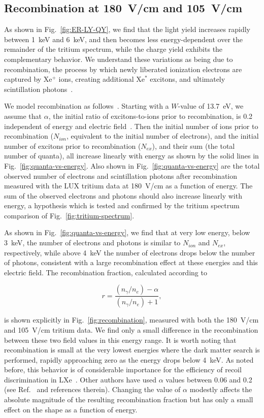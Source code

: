 \subsection{Recombination at 180~V/cm and 105~V/cm}

As shown in Fig.~\ref{fig:ER-LY-QY}, we find that the light yield increases rapidly between 1~keV and 6~keV, and then becomes less energy-dependent over the remainder of the tritium spectrum, while the charge yield exhibits the complementary behavior. We understand these variations as being due to recombination, the process by which newly liberated ionization electrons are captured by Xe$^+$ ions, creating additional Xe$^*$ excitons, and ultimately scintillation photons~\cite{conti}. 

We model recombination as follows~\cite{Dahl_Thesis,Sorensen_Dahl,nest_2011}. Starting with a $W$-value of 13.7~eV, we assume that $\alpha$, the initial ratio of excitons-to-ions prior to recombination, is 0.2 independent of energy and electric field~\cite{Doke_alpha, Aprile_alpha}. Then the initial number of ions prior to recombination ($N_{ion}$, equivalent to the initial number of electrons), and the initial number of excitons prior to recombination ($N_{ex}$), and their sum (the total number of quanta), all increase linearly with energy as shown by the solid lines in Fig.~\ref{fig:quanta-vs-energy}. Also shown in Fig.~\ref{fig:quanta-vs-energy} are the total observed number of electrons and scintillation photons after recombination measured with the LUX tritium data at 180~V/cm as a function of energy. The sum of the observed electrons and photons should also increase linearly with energy, a hypothesis which is tested and confirmed by the tritium spectrum comparison of Fig.~\ref{fig:tritium-spectrum}.

As shown in Fig.~\ref{fig:quanta-vs-energy}, we find that at very low energy, below 3~keV, the number of electrons and photons is similar to $N_{ion}$ and $N_{ex}$, respectively, while above 4~keV the number of electrons drops below the number of photons, consistent with a large recombination effect at these energies and this electric field. The recombination fraction, calculated according to

\begin{equation}
r = \frac{(n_{\gamma}/n_e) - \alpha}{(n_{\gamma}/n_e) + 1},
\end{equation}

\noindent
is shown explicitly in Fig.~\ref{fig:recombination}, measured with both the 180~V/cm and 105~V/cm tritium data. We find only a small difference in the recombination between these two field values in this energy range. It is worth noting that recombination is small at the very lowest energies where the dark matter search is performed, rapidly approaching zero as the energy drops below 4~keV. As noted before, this behavior is of considerable importance for the efficiency of recoil discrimination in LXe~\cite{xed-discrimination}. Other authors have used $\alpha$ values between 0.06 and 0.2 (see Ref.~\cite{kaixuan} and references therein). Changing the value of $\alpha$ modestly affects the absolute magnitude of the resulting recombination fraction but has only a small effect on the shape as a function of energy. 

